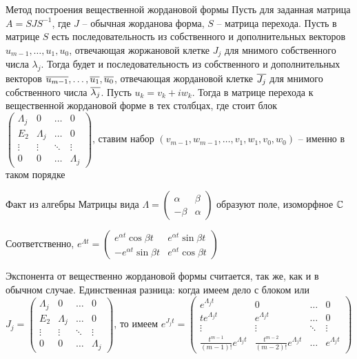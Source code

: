 \documentclass[12pt]{article}
\begin{document}
\begin{nota}{Метод построения вещественной жордановой формы}
    Пусть для заданная матрица $A = SJS^{-1}$, где $J$ -- обычная жорданова форма, $S$ -- матрица перехода. Пусть в матрице $S$ есть последовательность из собственного и дополнительных векторов $u_{m - 1}, \ldots, u_1, u_0$, отвечающая жоржановой клетке $J_j$ для мнимого собственного числа $\lambda_j$. Тогда будет и последовательность из собственного и дополнительных векторов $\overline{u_{m - 1}}, \ldots, \overline{u_1}, \overline{u_0}$, отвечающая жордановой клетке $\overline{J_j}$ для мнимого собственного числа $\overline{\lambda_j}$. Пусть $u_k = v_k + iw_k$. Тогда в матрице перехода к вещественной жордановой форме в тех столбцах, где стоит блок $\begin{pmatrix}
        \Lambda_j & 0 & \ldots & 0 \\
        E_2 & \Lambda_j & \ldots & 0 \\
        \vdots & \vdots & \ddots & \vdots \\
        0 & 0 & \ldots & \Lambda_j
    \end{pmatrix}$, ставим набор $(v_{m - 1}, w_{m - 1}, \ldots, v_1, w_1, v_0, w_0)$ -- именно в таком порядке
\end{nota}

\begin{nota}{Факт из алгебры}
    Матрицы вида $\Lambda = \begin{pmatrix}
        \alpha & \beta \\
        -\beta & \alpha
    \end{pmatrix}$ образуют поле, изоморфное $\mathbb C$

    Соответственно, $e^{\Lambda t} = \begin{pmatrix}
        e^{\alpha t} \cos \beta t & e^{\alpha t} \sin \beta t \\
        -e^{\alpha t} \sin \beta t & e^{\alpha t} \cos \beta t
    \end{pmatrix}$

    Экспонента от вещественно жордановой формы считается, так же, как и в обычном случае. Единственная разница: когда имеем дело с блоком или $J_j = \begin{pmatrix}
        \Lambda_j & 0 & \ldots & 0 \\
        E_2 & \Lambda_j & \ldots & 0 \\
        \vdots & \vdots & \ddots & \vdots \\
        0 & 0 & \ldots & \Lambda_j
    \end{pmatrix}$, то имеем $e^{J_jt} = \begin{pmatrix}
        e^{\Lambda_j t} & 0 & \ldots & 0 \\
        te^{\Lambda_j t} & e^{\Lambda_j t} & \ldots & 0 \\
        \vdots & \vdots & \ddots & \vdots \\
        \frac{t^{m - 1}}{(m - 1)!} e^{\Lambda_j t} & \frac{t^{m - 2}}{(m - 2)!} e^{\Lambda_j t} & \ldots & e^{\Lambda_j t}
    \end{pmatrix}$
\end{nota}
\end{document}
